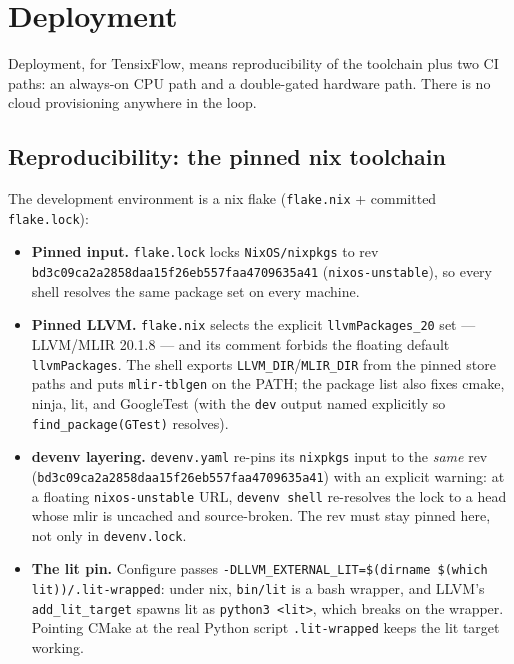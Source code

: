 \section{Deployment}\label{sec:deployment}

Deployment, for TensixFlow, means reproducibility of the toolchain plus two
CI paths: an always-on CPU path and a double-gated hardware path. There is
no cloud provisioning anywhere in the loop.

\subsection{Reproducibility: the pinned nix toolchain}

The development environment is a nix flake
(\texttt{flake.nix} + committed \texttt{flake.lock}):
\begin{itemize}[nosep]
  \item \textbf{Pinned input.} \texttt{flake.lock} locks
        \texttt{NixOS/nixpkgs} to rev
        \texttt{bd3c09ca2a2858daa15f26eb}\allowbreak\texttt{557faa4709635a41}
        (\texttt{nixos-unstable}), so every shell resolves the same package
        set on every machine.
  \item \textbf{Pinned LLVM.} \texttt{flake.nix} selects the explicit
        \texttt{llvmPackages\_20} set --- LLVM/MLIR 20.1.8 --- and its
        comment forbids the floating default \texttt{llvmPackages}. The
        shell exports \texttt{LLVM\_DIR}/\texttt{MLIR\_DIR} from the pinned
        store paths and puts \texttt{mlir-tblgen} on the PATH; the package
        list also fixes cmake, ninja, lit, and GoogleTest (with the
        \texttt{dev} output named explicitly so \texttt{find\_package(GTest)}
        resolves).
  \item \textbf{devenv layering.} \texttt{devenv.yaml} re-pins its
        \texttt{nixpkgs} input to the \emph{same} rev
        (\allowbreak\texttt{\scriptsize bd3c09ca2a2858daa15f26eb}\allowbreak\texttt{\scriptsize 557faa4709635a41}) with an explicit
        warning: at a floating \texttt{nixos-unstable} URL,
        \texttt{devenv shell} re-resolves the lock to a head whose mlir is
        uncached and source-broken. The rev must stay pinned here, not only
        in \texttt{devenv.lock}.
  \item \textbf{The lit pin.} Configure passes
        \texttt{-DLLVM\_EXTERNAL\_LIT=\$(dirname \$(which lit))/.lit-wrapped}:
        under nix, \texttt{bin/lit} is a bash wrapper, and LLVM's
        \texttt{add\_lit\_target} spawns lit as \texttt{python3 <lit>}, which
        breaks on the wrapper. Pointing CMake at the real Python script
        \texttt{.lit-wrapped} keeps the lit target working.
\end{itemize}

